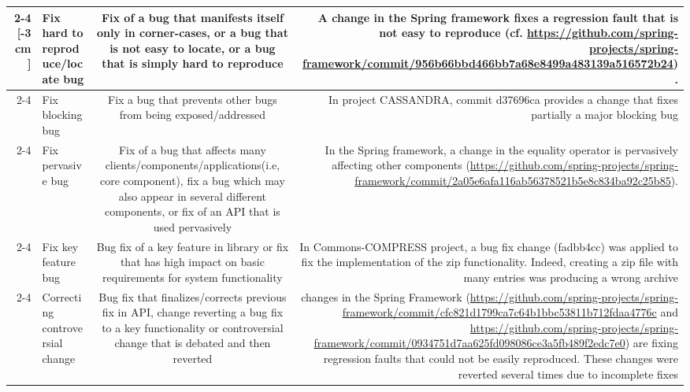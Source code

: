 \begin{table} [H]
\scriptsize
	\begin{tabular} {r |l | c | r}
	\cline{2-4}
	\multirow{5}{*}[-3cm]{\rotatebox[origin=r]{90}{Corrective changes}} &Fix hard to reproduce/locate bug & \multicolumn{1}{p{4cm}|}{Fix of a bug that manifests itself only in corner-cases, or a bug that is not easy to locate, or a bug that is simply hard to reproduce} & \multicolumn{1}{p{5.5cm}}{A change in the Spring framework fixes a regression fault that is not easy to reproduce (cf. {\tiny \url{https://github.com/spring-projects/spring-framework/commit/956b66bbd466bb7a68e8499a483139a516572b24}}).}\\\cline{2-4}
&Fix blocking bug & \multicolumn{1}{p{4cm}|}{Fix a bug that prevents other bugs from being exposed/addressed} & \multicolumn{1}{p{5.5cm}}{In project CASSANDRA, commit d37696ca provides a change that fixes partially a major blocking bug}\\ \cline{2-4}
	&Fix pervasive bug & \multicolumn{1}{p{4cm}|}{Fix of a bug that affects many clients/components/applications(i.e, core component),  fix a bug which may also appear in several different components, or  fix of an API that is used pervasively} & \multicolumn{1}{p{5.5cm}}{In the Spring framework, a change in the equality operator is pervasively affecting other components ({\tiny \url{https://github.com/spring-projects/spring-framework/commit/2a05e6afa116ab56378521b5e8c834ba92c25b85}}).}\\ \cline{2-4}
	&Fix key feature bug & \multicolumn{1}{p{4cm}|}{Bug fix of a key feature in library or fix that has high impact on basic requirements for system functionality}& \multicolumn{1}{p{5.5cm}}{In Commons-COMPRESS project, a bug fix change (fadbb4cc) was applied to fix the implementation of the zip functionality. Indeed, creating a zip file with many entries was producing a wrong archive}\\ \cline{2-4}
	&Correcting controversial change & \multicolumn{1}{p{4cm}|}{Bug fix that finalizes/corrects previous fix in API, change reverting a bug fix to a key functionality or controversial change that is debated and then reverted} &  \multicolumn{1}{p{5.5cm}}{changes in the Spring Framework ({\tiny \url{https://github.com/spring-projects/spring-framework/commit/cfc821d1799ca7c64b1bbc53811b712fdaa4776c}} and  {\tiny \url{https://github.com/spring-projects/spring-framework/commit/0934751d7aa625fd098086ce3a5fb489f2edc7e0}}) are fixing regression faults that could not be easily reproduced. These changes were reverted several times due to incomplete fixes}\\ \hline \hline
		
	\end{tabular}
\end{table}

